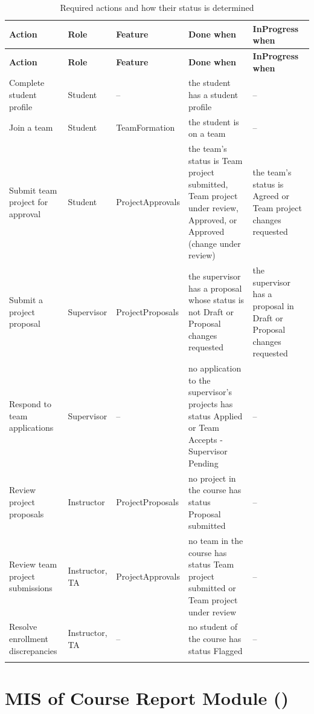 \documentclass[12pt, titlepage]{article}
\newcommand{\moduleid}[1]{\texttt{\detokenize{#1}}}
\begin{document}
\begingroup
\small
\renewcommand{\arraystretch}{1.2}
\begin{longtable}{>{\raggedright\arraybackslash}p{}
                  >{\raggedright\arraybackslash}p{}
                  >{\raggedright\arraybackslash}p{}
                  >{\raggedright\arraybackslash}p{}
                  >{\raggedright\arraybackslash}p{}}
\toprule
\textbf{Action} & \textbf{Role} & \textbf{Feature} & \textbf{Done when} & \textbf{InProgress when} \\
\midrule
\endfirsthead
\toprule
\textbf{Action} & \textbf{Role} & \textbf{Feature} & \textbf{Done when} & \textbf{InProgress when} \\
\midrule
\endhead
\endfoot
Complete student profile & Student & -- & the student has a student profile & -- \\
Join a team & Student & TeamFormation & the student is on a team & -- \\
Submit team project for approval & Student & ProjectApprovals & the team's status is Team project submitted, Team project under review, Approved, or Approved (change under review) & the team's status is Agreed or Team project changes requested \\
Submit a project proposal & Supervisor & ProjectProposals & the supervisor has a proposal whose status is not Draft or Proposal changes requested & the supervisor has a proposal in Draft or Proposal changes requested \\
Respond to team applications & Supervisor & -- & no application to the supervisor's projects has status Applied or Team Accepts - Supervisor Pending & -- \\
Review project proposals & Instructor & ProjectProposals & no project in the course has status Proposal submitted & -- \\
Review team project submissions & Instructor, TA & ProjectApprovals & no team in the course has status Team project submitted or Team project under review & -- \\
Resolve enrollment discrepancies & Instructor, TA & -- & no student of the course has status Flagged & -- \\
\bottomrule
\caption{Required actions and how their status is determined}
\label{TblRequiredActions}
\end{longtable}
\endgroup


\newpage

\section[MIS of Course Report Module]{MIS of Course Report Module (\moduleid{M_CourseReport})}
\label{M_CourseReport}
\end{document}
